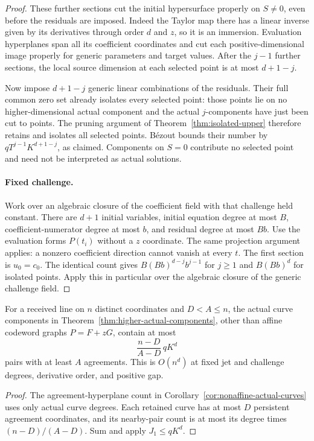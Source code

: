 \begin{proof}
These further sections cut the initial hypersurface properly on
$S\ne0$, even before the residuals are imposed. Indeed the Taylor
map there has a linear inverse given by its derivatives through order $d$ and $z$,
so it is an immersion. Evaluation hyperplanes span all its coefficient
coordinates and cut each positive-dimensional image properly for
generic parameters and target values. After the $j-1$ further
sections, the local source dimension at each selected point is at
most $d+1-j$.

Now impose $d+1-j$ generic linear combinations of the residuals.
Their full common zero set already isolates every selected point:
those points lie on no higher-dimensional actual component and the
actual $j$-components have just been cut to points. The pruning
argument of Theorem~\ref{thm:isolated-upper} therefore retains and
isolates all selected points. B\'ezout bounds their number by
$qT^{j-1}K^{d+1-j}$, as claimed. Components on $S=0$ contribute
no selected point and need not be interpreted as actual solutions.

\paragraph{Fixed challenge.}
Work over an algebraic closure of the coefficient field with that
challenge held constant. There are $d+1$ initial variables, initial
equation degree at most $B$, coefficient-numerator degree at most
$b$, and residual degree at most $Bb$. Use the evaluation forms
$P(t_i)$ without a $z$ coordinate. The same projection argument
applies: a nonzero coefficient direction cannot vanish at every
$t$. The first section is $u_0=c_0$. The identical count gives
$B(Bb)^{d-j}b^{j-1}$ for $j\ge1$ and $B(Bb)^d$ for isolated
points. Apply this in particular over the algebraic closure of the
generic challenge field.
\end{proof}

\begin{corollary}
\label{cor:higher-nonaffine-curves}
For a received line on $n$ distinct coordinates and $D<A\le n$,
the actual curve components in Theorem~\ref{thm:higher-actual-components},
other than affine codeword graphs $P=F+zG$, contain at most
\[
 \frac{n-D}{A-D}\,qK^d
\]
pairs with at least $A$ agreements. This is $O(n^d)$ at fixed
jet and challenge degrees, derivative order, and positive gap.
\end{corollary}
\begin{proof}
The agreement-hyperplane count in
Corollary~\ref{cor:nonaffine-actual-curves} uses only actual curve
degrees. Each retained curve has at most $D$ persistent agreement
coordinates, and its nearby-pair count is at most its degree times
$(n-D)/(A-D)$. Sum and apply $J_1\le qK^d$.
\end{proof}

